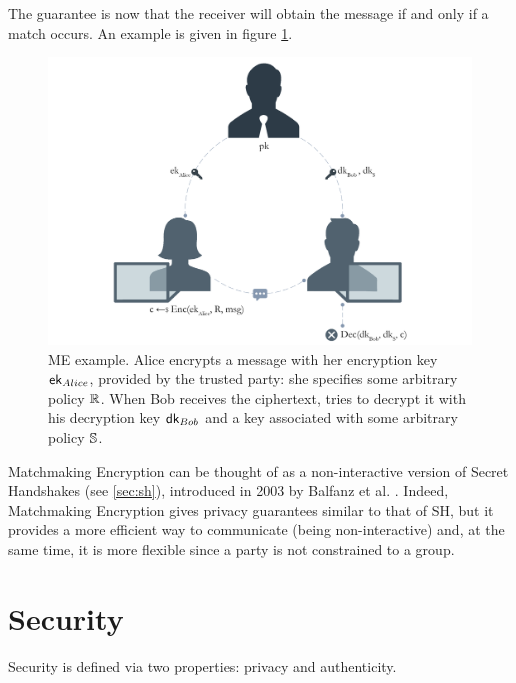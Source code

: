 The guarantee is now that the receiver will obtain the message if and only if a match occurs.
An example is given in figure \ref{fig:me_example}.
\begin{figure}[ht]
    \centering
    \includegraphics[width=\linewidth]{images/me.png}
    \caption{ME example. Alice encrypts a message with her encryption key $\mathsf{ek}_{Alice}$, provided by the trusted party: she specifies some arbitrary policy $\mathbb{R}$. When Bob receives the ciphertext, tries to decrypt it with his decryption key $\mathsf{dk}_{Bob}$ and a key associated with some arbitrary policy $\mathbb{S}$.}
    \label{fig:me_example}
\end{figure}
\newline\newline
Matchmaking Encryption can be thought of as a non-interactive version of Secret Handshakes (see \ref{sec:sh}), introduced in 2003 by Balfanz et al. \cite{Balfanz}.
Indeed, Matchmaking Encryption gives privacy guarantees similar to that of SH, but it provides a more efficient way to communicate (being non-interactive) and, at the same time, it is more flexible since a party is not constrained to a group.

\section{Security}
Security is defined via two properties: privacy and authenticity.

